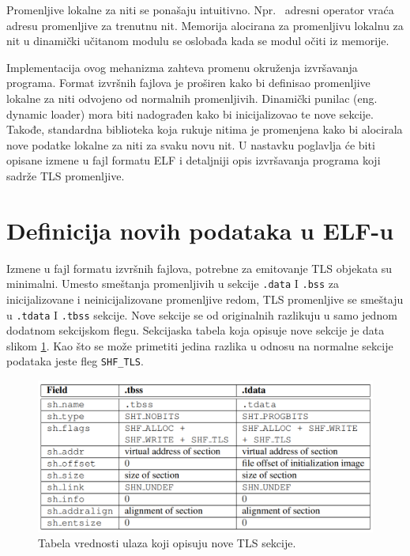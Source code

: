 \documentclass[12pt,oneside]{memoir}
\begin{document}
Promenljive lokalne za niti se ponašaju intuitivno. Npr.~ adresni operator vraća adresu promenljive za trenutnu nit. Memorija alocirana za promenljivu lokalnu za nit u dinamički učitanom modulu se oslobađa kada se modul očiti iz memorije.

Implementacija ovog mehanizma zahteva promenu okruženja izvršavanja programa. Format izvršnih fajlova je proširen kako bi definisao promenljive lokalne za niti odvojeno od normalnih promenljivih. Dinamički punilac (eng. dynamic loader) mora biti nadograđen kako bi inicijalizovao te nove sekcije. Takođe, standardna biblioteka koja rukuje nitima je promenjena kako bi alocirala nove podatke lokalne za niti za svaku novu nit. U nastavku poglavlja će biti opisane izmene u fajl formatu ELF i detaljniji opis izvršavanja programa koji sadrže TLS promenljive.

\section{Definicija novih podataka u ELF-u}

Izmene u fajl formatu izvršnih fajlova, potrebne za emitovanje TLS objekata su minimalni. Umesto smeštanja promenljivih u sekcije \texttt{.data} I \texttt{.bss} za inicijalizovane i neinicijalizovane promenljive redom, TLS promenljive se smeštaju u \texttt{.tdata} I \texttt{.tbss} sekcije. Nove sekcije se od originalnih razlikuju u samo jednom dodatnom sekcijskom flegu. Sekcijaska tabela koja opisuje nove sekcije je data slikom \ref{fig:tls_secs}. Kao što se može primetiti jedina razlika u odnosu na normalne sekcije podataka jeste fleg \texttt{SHF\_TLS}.

\begin{figure}[h!]
	\begin{center}
		\includegraphics[scale=0.6]{slike/tabela1elfTLS.png}
	\end{center}
	\caption{Tabela vrednosti ulaza koji opisuju nove TLS sekcije.}
	\label{fig:tls_secs}
\end{figure}
\end{document}
